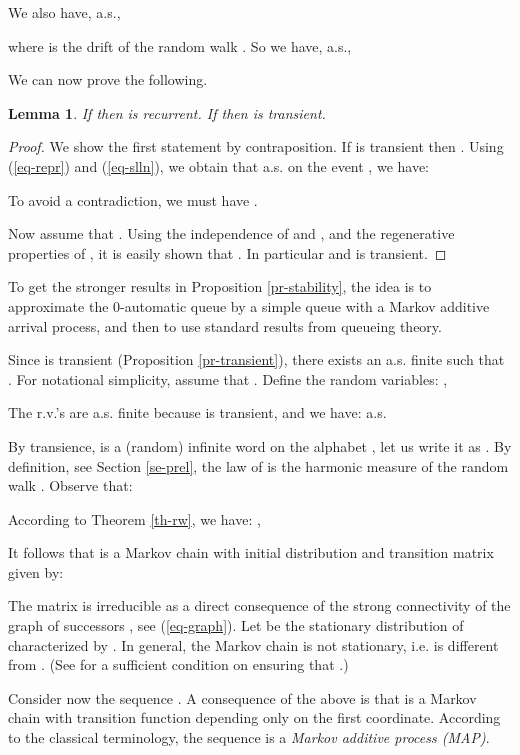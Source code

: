 \documentclass[11pt,a4paper]{article}
\newtheorem{lemma}[theorem]{Lemma}
\theoremstyle{remark}
\def\eref#1{(\ref{#1})}
\begin{document}
We also have, a.s.,

where  is the drift of the random walk
. So we have, a.s.,




We can now prove the following.

\begin{lemma}\label{le-step0}
If  then  is recurrent. If  then  is transient.
\end{lemma}

\begin{proof}
We show the first statement by contraposition. If  is transient
then . Using \eref{eq-repr} and \eref{eq-slln},
we obtain that a.s. on the event , we have:

To avoid a contradiction, we must have  .

Now assume that . Using the
independence of  and , and the regenerative properties of , it is
easily shown that
. In particular
 and  is transient.
\end{proof}

To get the stronger results in Proposition \ref{pr-stability}, the
idea is to approximate the 0-automatic queue by a simple queue with a
Markov additive arrival process, and then to use standard results
from queueing theory.

\medskip

Since  is transient (Proposition \ref{pr-transient}),
there exists an a.s. finite  such that . For notational simplicity, assume that
. Define the random variables: ,

The r.v.'s  are a.s. finite because  is transient, and we
have:
 a.s.

By transience,  is a (random) infinite word on the
alphabet , let us write it as .
By definition, see Section
\ref{se-prel}, the law of  is the harmonic measure
 of the random walk . Observe that:

According to Theorem
\ref{th-rw}, we have: ,


It follows that  is a Markov chain with initial distribution
 and transition matrix  given by:

The matrix  is irreducible as a direct consequence of the
strong connectivity of the graph of successors , see
\eref{eq-graph}. 
Let  be the stationary
distribution of  characterized by . In general, the
Markov chain  is not stationary, i.e.  is
different from . (See \cite[Proposition 3.6]{MaMa} for a
sufficient condition on  ensuring that
.)

\medskip

Consider now the sequence . A consequence of the above
is that  is a Markov chain with transition function
depending only on the first coordinate. According to the classical
terminology, the sequence  is a {\em Markov additive
  process (MAP)}.
\end{document}
